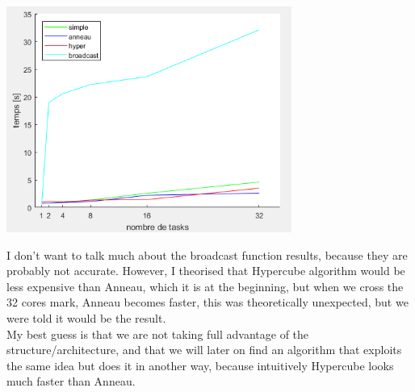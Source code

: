 \documentclass[a4paper]{article}
\begin{document}
\begin{center}
\includegraphics[width=0.7\textwidth]{images/graph2.PNG}\\[1cm] 
\end{center}

I don't want to talk much about the broadcast function results, because they are probably not accurate. However, I theorised that Hypercube algorithm would be less expensive than Anneau, which it is at the beginning, but when we cross the 32 cores mark, Anneau becomes faster, this was theoretically unexpected, but we were told it would be the result.\\
My best guess is that we are not taking full advantage of the structure/architecture, and that we will later on find an algorithm that exploits the same idea but does it in another way, because intuitively Hypercube looks much faster than Anneau.
\end{document}
